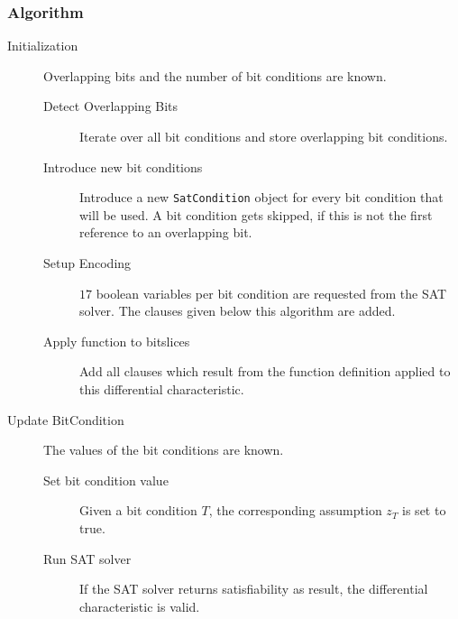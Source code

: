 \subsubsection{Algorithm}
\label{sec:exhaustive-algorithm}
%
\begin{description}
  \item[Initialization] Overlapping bits and the number of bit conditions are known.
    \begin{description}
      \item[Detect Overlapping Bits] Iterate over all bit conditions and store overlapping bit conditions.
      \item[Introduce new bit conditions] Introduce a new \texttt{SatCondition} object for every bit condition that will be used. A bit condition gets skipped, if this is not the first reference to an overlapping bit.
      \item[Setup Encoding] $17$ boolean variables per bit condition are requested from the SAT solver. The clauses given below this algorithm are added.
      \item[Apply function to bitslices] Add all clauses which result from the function definition applied to this differential characteristic.
    \end{description}
  \item[Update BitCondition] The values of the bit conditions are known.
    \begin{description}
      \item[Set bit condition value] Given a bit condition $T$, the corresponding assumption $z_T$ is set to true.
      \item[Run SAT solver] If the SAT solver returns satisfiability as result, the differential characteristic is valid.
    \end{description}
\end{description}


